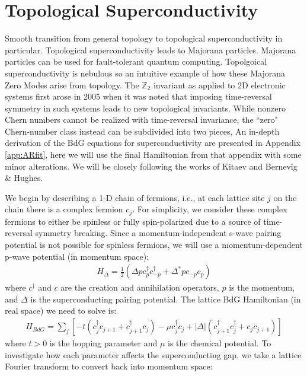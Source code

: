 \section{Topological Superconductivity}
Smooth transition from general topology to topological superconductivity in particular. Topological superconductivity leads to Majorana particles. Majorana particles can be used for fault-tolerant quantum computing. Topolgoical superconductivity is nebulous so an intuitive example of how these Majorana Zero Modes arise from topology.
The $\mathbb{Z}_{2}$ invariant as applied to 2D electronic systems first arose in 2005 when it was noted that imposing time-reversal symmetry in such systems leads to new topological invariants\cite{Kane2005}. While nonzero Chern numbers cannot be realized with time-reversal invariance, the ``zero" Chern-number class instead can be subdivided into two pieces, 
An in-depth derivation of the \ac{BdG} equations for superconductivity are presented in Appendix \ref{app:ARfit}, here we will use the final Hamiltonian from that appendix with some minor alterations. We will be closely following the works of Kitaev and Bernevig \& Hughes\cite{Kitaev2001, bernevig_hughes_2013}.\par 
We begin by describing a 1-D chain of fermions, i.e., at each lattice site $j$ on the chain there is a complex fermion $c_{j}$. For simplicity, we consider these complex fermions to either be spinless or fully spin-polarized due to a source of time-reversal symmetry breaking. Since a momentum-independent s-wave pairing potential is not possible for spinless fermions, we will use a momentum-dependent p-wave potential (in momentum space):
\begin{align}
	H_{\Delta} = \frac{1}{2}\left(\Delta pc_{p}^{\dagger}c_{-p}^{\dagger}+\Delta^{*}pc_{-p}c_{p}\right)
\end{align}
where $c^{\dagger}$ and $c$ are the creation and annihilation operators, $p$ is the momentum, and $\Delta$ is the superconducting pairing potential. The lattice \ac{BdG} Hamiltonian (in real space) we need to solve is:
\begin{align}
	H_{BdG} = \sum_{j}\left[-t\left(c_{j}^{\dagger}c_{j+1}+c_{j+1}^{\dagger}c_{j}\right)-\mu c_{j}^{\dagger}c_{j}+|\Delta|\left(c_{j+1}^{\dagger}c_{j}^{\dagger}+c_{j}c_{j+1}\right)\right]
\end{align}
where $t>0$ is the hopping parameter and $\mu$ is the chemical potential. To investigate how each parameter affects the superconducting gap, we take a lattice Fourier transform to convert back into momentum space:
